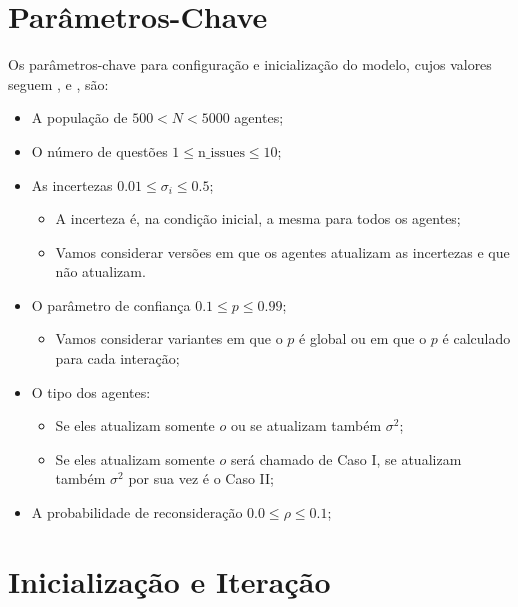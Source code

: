 \section{Parâmetros-Chave}

Os parâmetros-chave para configuração e inicialização do modelo, cujos valores
seguem ,  e
, são:

\begin{itemize}
\item A população de \(500 < N < 5000\) agentes;
\item O número de questões \(1 \leq \text{n\_issues} \leq 10\); 

\item As incertezas \(0.01 \leq \sigma_i \leq 0.5\);
  \begin{itemize}
  \item A incerteza é, na condição inicial, a mesma para todos os agentes;
  \item Vamos considerar versões em que os agentes atualizam as incertezas e que
    não atualizam.
  \end{itemize}

\item O parâmetro de confiança \(0.1 \leq p \leq 0.99\);
  
  \begin{itemize}
  \item Vamos considerar variantes em que o \(p\) é global ou em que o \(p\) é
    calculado para cada interação;
  \end{itemize}

\item O tipo dos agentes:
  \begin{itemize}
  \item Se eles atualizam somente \(o\) ou se atualizam também \(\sigma^2\);
    \item Se eles atualizam somente \(o\) será chamado de Caso I, se atualizam
      também \(\sigma^2\) por sua vez é o Caso II;
  \end{itemize}

\item A probabilidade de reconsideração \(0.0 \leq \rho  \leq 0.1\);
  
\end{itemize}

\section{Inicialização e Iteração}

